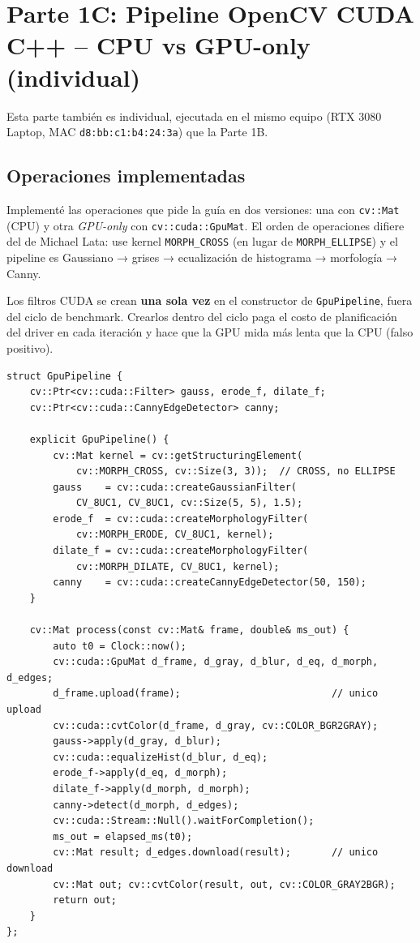 \documentclass[12pt,a4paper]{article}
\let\oldsubsection\subsection
\renewcommand{\subsection}[1]{\needspace{5\baselineskip}\oldsubsection{#1}}
\begin{document}
\section{Parte 1C: Pipeline OpenCV CUDA C++ -- CPU vs GPU-only (individual)}

Esta parte también es individual, ejecutada en el mismo equipo (RTX 3080 Laptop, MAC \texttt{d8:bb:c1:b4:24:3a}) que la Parte 1B.

\subsection{Operaciones implementadas}

Implementé las operaciones que pide la guía en dos versiones: una con \texttt{cv::Mat} (CPU) y otra \emph{GPU-only} con \texttt{cv::cuda::GpuMat}. El orden de operaciones difiere del de Michael Lata: use kernel \texttt{MORPH\_CROSS} (en lugar de \texttt{MORPH\_ELLIPSE}) y el pipeline es Gaussiano → grises → ecualización de histograma → morfología → Canny.

Los filtros CUDA se crean \textbf{una sola vez} en el constructor de \texttt{GpuPipeline}, fuera del ciclo de benchmark. Crearlos dentro del ciclo paga el costo de planificación del driver en cada iteración y hace que la GPU mida más lenta que la CPU (falso positivo).

\begin{lstlisting}
struct GpuPipeline {
    cv::Ptr<cv::cuda::Filter> gauss, erode_f, dilate_f;
    cv::Ptr<cv::cuda::CannyEdgeDetector> canny;

    explicit GpuPipeline() {
        cv::Mat kernel = cv::getStructuringElement(
            cv::MORPH_CROSS, cv::Size(3, 3));  // CROSS, no ELLIPSE
        gauss    = cv::cuda::createGaussianFilter(
            CV_8UC1, CV_8UC1, cv::Size(5, 5), 1.5);
        erode_f  = cv::cuda::createMorphologyFilter(
            cv::MORPH_ERODE, CV_8UC1, kernel);
        dilate_f = cv::cuda::createMorphologyFilter(
            cv::MORPH_DILATE, CV_8UC1, kernel);
        canny    = cv::cuda::createCannyEdgeDetector(50, 150);
    }

    cv::Mat process(const cv::Mat& frame, double& ms_out) {
        auto t0 = Clock::now();
        cv::cuda::GpuMat d_frame, d_gray, d_blur, d_eq, d_morph, d_edges;
        d_frame.upload(frame);                          // unico upload
        cv::cuda::cvtColor(d_frame, d_gray, cv::COLOR_BGR2GRAY);
        gauss->apply(d_gray, d_blur);
        cv::cuda::equalizeHist(d_blur, d_eq);
        erode_f->apply(d_eq, d_morph);
        dilate_f->apply(d_morph, d_morph);
        canny->detect(d_morph, d_edges);
        cv::cuda::Stream::Null().waitForCompletion();
        ms_out = elapsed_ms(t0);
        cv::Mat result; d_edges.download(result);       // unico download
        cv::Mat out; cv::cvtColor(result, out, cv::COLOR_GRAY2BGR);
        return out;
    }
};
\end{lstlisting}
\end{document}
